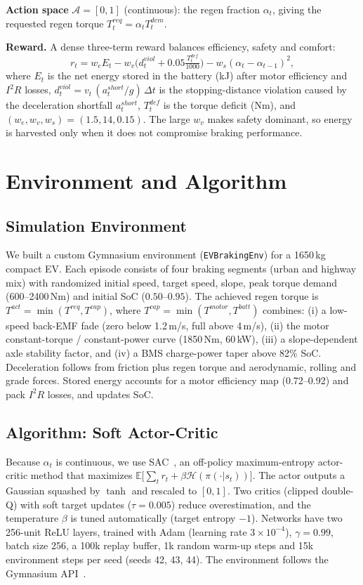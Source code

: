 \documentclass[10pt,twocolumn,letterpaper]{article}
\begin{document}
\textbf{Action space} $\mathcal{A}=[0,1]$ (continuous): the regen fraction $\alpha_t$, giving the
requested regen torque $T^{req}_t=\alpha_t T^{dem}_t$.

\textbf{Reward.} A dense three-term reward balances efficiency, safety and comfort:
\begin{equation}
r_t = w_e E_t - w_v\Big(d^{viol}_t + 0.05\tfrac{T^{def}_t}{1000}\Big) - w_s(\alpha_t-\alpha_{t-1})^2,
\end{equation}
where $E_t$ is the net energy stored in the battery (kJ) after motor efficiency and $I^2R$ losses,
$d^{viol}_t = v_t\,(a^{short}_t/g)\,\Delta t$ is the stopping-distance violation caused by the deceleration
shortfall $a^{short}_t$, $T^{def}_t$ is the torque deficit (Nm), and $(w_e,w_v,w_s)=(1.5,14,0.15)$. The large $w_v$
makes safety dominant, so energy is harvested only when it does not compromise braking performance.

\section{Environment and Algorithm}
\subsection{Simulation Environment}
We built a custom Gymnasium environment (\texttt{EVBrakingEnv}) for a 1650\,kg compact EV. Each episode
consists of four braking segments (urban and highway mix) with randomized initial speed, target speed, slope,
peak torque demand (600--2400\,Nm) and initial SoC ($0.50$--$0.95$). The achieved regen torque is
$T^{act}=\min(T^{req},T^{cap})$, where $T^{cap}=\min(T^{motor},T^{batt})$ combines:
(i) a low-speed back-EMF fade (zero below 1.2\,m/s, full above 4\,m/s),
(ii) the motor constant-torque / constant-power curve (1850\,Nm, 60\,kW),
(iii) a slope-dependent axle stability factor, and
(iv) a BMS charge-power taper above 82\% SoC.
Deceleration follows from friction plus regen torque and aerodynamic, rolling and grade forces. Stored energy
accounts for a motor efficiency map (0.72--0.92) and pack $I^2R$ losses, and updates SoC.

\subsection{Algorithm: Soft Actor-Critic}
Because $\alpha_t$ is continuous, we use SAC~\cite{haarnoja2018sac,haarnoja2018apps}, an off-policy maximum-entropy
actor-critic method that maximizes $\mathbb{E}\big[\sum_t r_t+\beta\mathcal{H}(\pi(\cdot|s_t))\big]$.
The actor outputs a Gaussian squashed by $\tanh$ and rescaled to $[0,1]$. Two critics (clipped double-Q)
with soft target updates ($\tau=0.005$) reduce overestimation, and the temperature $\beta$ is tuned
automatically (target entropy $-1$). Networks have two 256-unit ReLU layers, trained with Adam
(learning rate $3\times10^{-4}$), $\gamma=0.99$, batch size 256, a 100k replay buffer, 1k random warm-up steps
and 15k environment steps per seed (seeds 42, 43, 44). The environment follows the Gymnasium API~\cite{towers2024gymnasium}.
\end{document}
